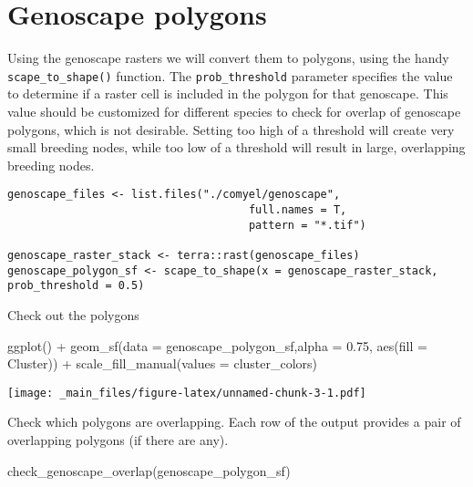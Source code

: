 \documentclass[
]{book}
\newenvironment{Shaded}{\begin{snugshade}}{\end{snugshade}}
\newcommand{\AttributeTok}[1]{\textcolor[rgb]{0.77,0.63,0.00}{#1}}
\newcommand{\FloatTok}[1]{\textcolor[rgb]{0.00,0.00,0.81}{#1}}
\newcommand{\FunctionTok}[1]{\textcolor[rgb]{0.00,0.00,0.00}{#1}}
\newcommand{\NormalTok}[1]{#1}
\newcommand{\SpecialCharTok}[1]{\textcolor[rgb]{0.00,0.00,0.00}{#1}}
\begin{document}
\hypertarget{genoscape-polygons}{%
\section{Genoscape polygons}\label{genoscape-polygons}}

Using the genoscape rasters we will convert them to polygons, using the handy \texttt{scape\_to\_shape()} function. The \texttt{prob\_threshold} parameter specifies the value to determine if a raster cell is included in the polygon for that genoscape. This value should be customized for different species to check for overlap of genoscape polygons, which is not desirable. Setting too high of a threshold will create very small breeding nodes, while too low of a threshold will result in large, overlapping breeding nodes.

\begin{verbatim}
genoscape_files <- list.files("./comyel/genoscape", 
                                     full.names = T,
                                     pattern = "*.tif")

genoscape_raster_stack <- terra::rast(genoscape_files)
genoscape_polygon_sf <- scape_to_shape(x = genoscape_raster_stack, prob_threshold = 0.5)
\end{verbatim}

Check out the polygons

\begin{Shaded}
\begin{Highlighting}[]
\FunctionTok{ggplot}\NormalTok{() }\SpecialCharTok{+}
  \FunctionTok{geom\_sf}\NormalTok{(}\AttributeTok{data =}\NormalTok{ genoscape\_polygon\_sf,}\AttributeTok{alpha =} \FloatTok{0.75}\NormalTok{, }\FunctionTok{aes}\NormalTok{(}\AttributeTok{fill =}\NormalTok{ Cluster)) }\SpecialCharTok{+}
  \FunctionTok{scale\_fill\_manual}\NormalTok{(}\AttributeTok{values =}\NormalTok{ cluster\_colors)}
\end{Highlighting}
\end{Shaded}

\texttt{[image: \_main\_files/figure-latex/unnamed-chunk-3-1.pdf]}

Check which polygons are overlapping. Each row of the output provides a pair of overlapping polygons (if there are any).

\begin{Shaded}
\begin{Highlighting}[]
\FunctionTok{check\_genoscape\_overlap}\NormalTok{(genoscape\_polygon\_sf)}
\end{Highlighting}
\end{Shaded}
\end{document}
